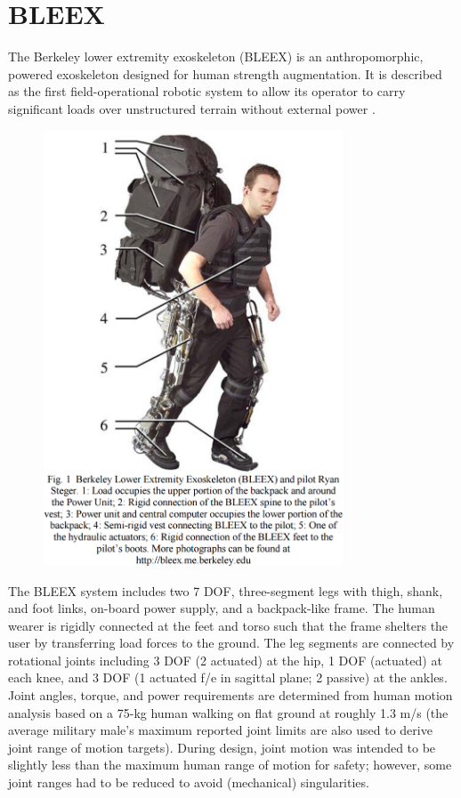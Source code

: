 \section{BLEEX}
\label{exo:bleex}
\begin{refsection}


The Berkeley lower extremity exoskeleton (BLEEX) is an anthropomorphic, powered exoskeleton designed for human strength augmentation.  It is described as the first field-operational robotic system to allow its operator to carry significant loads over unstructured terrain without external power \cite{bleex_design_2006}.

\begin{figure}[ht]
  \centering
  \includegraphics[width=3.5in]{exos/figs/bleex_exo.png}
\end{figure}

The BLEEX system includes two 7 DOF, three-segment legs with thigh, shank, and foot links, on-board power supply, and a backpack-like frame.  The human wearer is rigidly connected at the feet and torso such that the frame shelters the user by transferring load forces to the ground.  The leg segments are connected by rotational joints including 3 DOF (2 actuated) at the hip, 1 DOF (actuated) at each knee, and 3 DOF (1 actuated f/e in sagittal 
plane; 2 passive) at the ankles.  Joint angles, torque, and power requirements are determined from human motion analysis based on a 75-kg human walking on flat ground at roughly 1.3 m/s (the average military male's maximum reported joint limits are also used to derive joint range of motion targets).  During design, joint motion was intended to be slightly less than the maximum human range of motion for safety; however, some joint ranges had to be reduced to avoid (mechanical) singularities.


\end{refsection}

